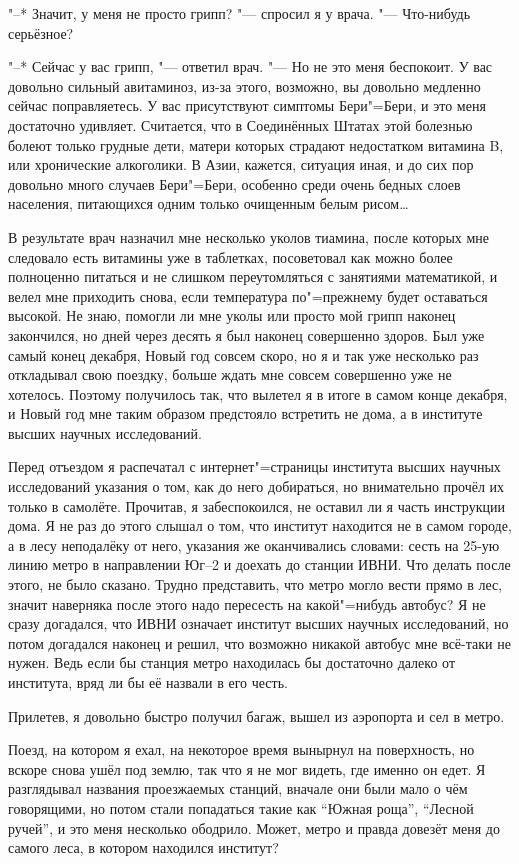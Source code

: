 "--* Значит, у меня не просто грипп? "--- спросил я у врача.
"--- Что-нибудь серьёзное?

"--* Сейчас у вас грипп, "--- ответил врач.
"--- Но не это меня беспокоит.
У вас довольно сильный авитаминоз, из-за этого, возможно, вы довольно медленно
сейчас поправляетесь.
У вас присутствуют симптомы Бери"=Бери, и это меня достаточно удивляет.
Считается, что в Соединённых Штатах этой болезнью болеют только грудные дети,
матери которых страдают недостатком витамина B, или хронические алкоголики.
В Азии, кажется, ситуация иная, и до сих пор довольно много случаев Бери"=Бери,
особенно среди очень бедных слоев населения, питающихся одним только очищенным
белым рисом\ldots

В результате врач назначил мне несколько уколов тиамина, после которых мне
следовало есть витамины уже в таблетках, посоветовал как можно более полноценно
питаться и не слишком переутомляться с занятиями математикой, и велел мне
приходить снова, если температура по"=прежнему будет оставаться высокой.
Не знаю, помогли ли мне уколы или просто мой грипп наконец закончился, но дней
через десять я был наконец совершенно здоров.
Был уже самый конец декабря, Новый год совсем скоро, но я и так уже несколько
раз откладывал свою поездку, больше ждать мне совсем совершенно уже не хотелось.
Поэтому получилось так, что вылетел я в итоге в самом конце декабря, и Новый год
мне таким образом предстояло встретить не дома, а в институте высших научных
исследований.

Перед отъездом я распечатал с интернет"=страницы института высших научных
исследований указания о том, как до него добираться, но внимательно прочёл их
только в самолёте.
Прочитав, я забеспокоился, не оставил ли я часть инструкции дома.
Я не раз до этого слышал о том, что институт находится не в самом городе, а в
лесу неподалёку от него, указания же оканчивались словами: сесть на 25-ую линию
метро в направлении Юг--2 и доехать до станции ИВНИ.
Что делать после этого, не было сказано.
Трудно представить, что метро могло вести прямо в лес, значит наверняка после
этого надо пересесть на какой"=нибудь автобус?
Я не сразу догадался, что ИВНИ означает институт высших научных исследований,
но потом догадался наконец и решил, что возможно никакой автобус мне всё-таки не
нужен.
Ведь если бы станция метро находилась бы достаточно далеко от института, вряд ли
бы её назвали в его честь.

Прилетев, я довольно быстро получил багаж, вышел из аэропорта и сел в метро.

Поезд, на котором я ехал, на некоторое время вынырнул на поверхность, но вскоре
снова ушёл под землю, так что я не мог видеть, где именно он едет.
Я разглядывал названия проезжаемых станций, вначале они были мало о чём
говорящими, но потом стали попадаться такие как \enquote{Южная роща},
\enquote{Лесной ручей}, и это меня несколько ободрило.
Может, метро и правда довезёт меня до самого леса, в котором находился институт?

